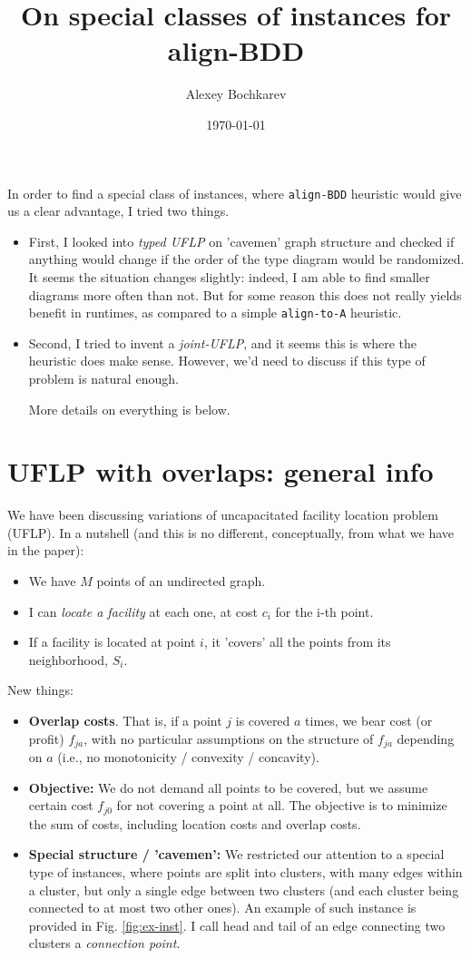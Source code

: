 \documentclass[11pt]{article}
\author{Alexey Bochkarev}
\date{\today}
\title{On special classes of instances for align-BDD}
\begin{document}
\maketitle
In order to find a special class of instances, where \texttt{align-BDD} heuristic would
give us a clear advantage, I tried two things.
\begin{itemize}
\item First, I looked into \emph{typed UFLP} on 'cavemen' graph structure and checked if
anything would change if the order of the type diagram would be randomized.
It seems the situation changes slightly: indeed, I am able to find smaller
diagrams more often than not. But for some reason this does not really yields
benefit in runtimes, as compared to a simple \texttt{align-to-A} heuristic.
\item Second, I tried to invent a \emph{joint-UFLP}, and it seems this is where the
heuristic does make sense. However, we'd need to discuss if this type of
problem is natural enough.

More details on everything is below.
\end{itemize}

\section{UFLP with overlaps: general info}
\label{sec:org449f21f}
We have been discussing variations of uncapacitated facility location problem
(UFLP). In a nutshell (and this is no different, conceptually, from what we have
in the paper):
\begin{itemize}
\item We have \(M\) points of an undirected graph.
\item I can \emph{locate a facility} at each one, at cost \(c_i\) for the i-th point.
\item If a facility is located at point \(i\), it 'covers' all the points from its
neighborhood, \(S_i\).
\end{itemize}

New things:
\begin{itemize}
\item \textbf{Overlap costs}. That is, if a point \(j\) is covered \(a\) times,
we bear cost (or profit) \(f_{ja}\), with no particular assumptions on the structure
of \(f_{ja}\) depending on \(a\) (i.e., no monotonicity / convexity / concavity).
\item \textbf{Objective:} We do not demand all points to be covered, but we assume certain cost \(f_{j0}\)
for not covering a point at all. The objective is to minimize the sum of
costs, including location costs and overlap costs.
\item \textbf{Special structure / 'cavemen':} We restricted our attention to a special type
of instances, where points are split into clusters, with many edges within a
cluster, but only a single edge between two clusters (and each cluster being
connected to at most two other ones). An example of such instance is provided
in Fig. \ref{fig:ex-inst}. I call head and tail of an edge connecting two
clusters a \emph{connection point}.
\end{itemize}
\end{document}
